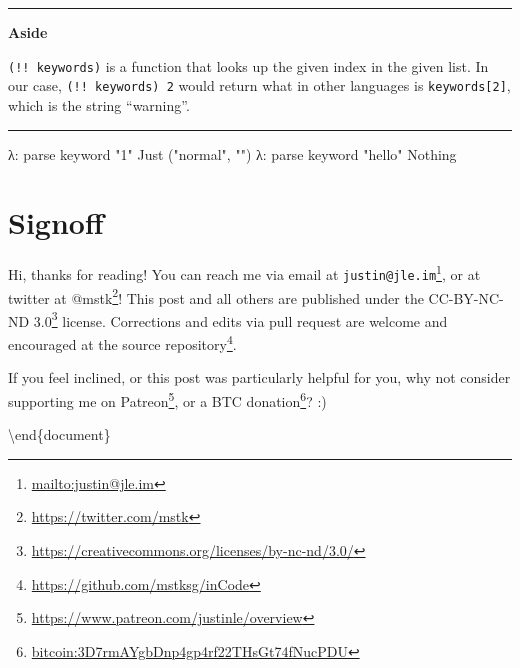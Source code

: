 \documentclass[]{article}
\newenvironment{Shaded}{}{}
\newcommand{\DataTypeTok}[1]{\textcolor[rgb]{0.56,0.13,0.00}{#1}}
\newcommand{\FunctionTok}[1]{\textcolor[rgb]{0.02,0.16,0.49}{#1}}
\newcommand{\NormalTok}[1]{#1}
\newcommand{\OperatorTok}[1]{\textcolor[rgb]{0.40,0.40,0.40}{#1}}
\newcommand{\OtherTok}[1]{\textcolor[rgb]{0.00,0.44,0.13}{#1}}
\newcommand{\StringTok}[1]{\textcolor[rgb]{0.25,0.44,0.63}{#1}}
\renewcommand{\href}[2]{#2\footnote{\url{#1}}}
\begin{document}
\begin{Shaded}
\end{Shaded}

\begin{center}\rule{0.5\linewidth}{0.5pt}\end{center}

\textbf{Aside}

\texttt{(!!\ keywords)} is a function that looks up the given index in the given
list. In our case, \texttt{(!!\ keywords)\ 2} would return what in other
languages is \texttt{keywords{[}2{]}}, which is the string ``warning''.

\begin{center}\rule{0.5\linewidth}{0.5pt}\end{center}

\begin{Shaded}
\begin{Highlighting}[]
\NormalTok{λ}\OperatorTok{:}\NormalTok{ parse keyword }\StringTok{"1"}
\DataTypeTok{Just}\NormalTok{ (}\StringTok{"normal"}\NormalTok{, }\StringTok{""}\NormalTok{)}
\NormalTok{λ}\OperatorTok{:}\NormalTok{ parse keyword }\StringTok{"hello"}
\DataTypeTok{Nothing}
\end{Highlighting}
\end{Shaded}

\section{Signoff}\label{signoff}

Hi, thanks for reading! You can reach me via email at
\href{mailto:justin@jle.im}{\nolinkurl{justin@jle.im}}, or at twitter at
\href{https://twitter.com/mstk}{@mstk}! This post and all others are published
under the \href{https://creativecommons.org/licenses/by-nc-nd/3.0/}{CC-BY-NC-ND
3.0} license. Corrections and edits via pull request are welcome and encouraged
at \href{https://github.com/mstksg/inCode}{the source repository}.

If you feel inclined, or this post was particularly helpful for you, why not
consider \href{https://www.patreon.com/justinle/overview}{supporting me on
Patreon}, or a \href{bitcoin:3D7rmAYgbDnp4gp4rf22THsGt74fNucPDU}{BTC donation}?
:)

\textbackslash end\{document\}
\end{document}
